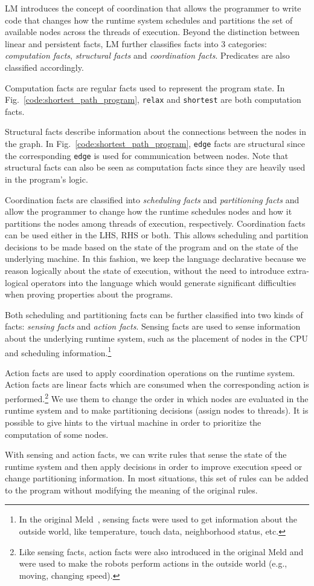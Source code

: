 LM introduces the concept of coordination that allows the programmer to write
code that changes how the runtime system schedules and partitions the set of
available nodes across the threads of execution. Beyond the distinction between
linear and persistent facts, LM further classifies facts into 3 categories:
\emph{computation facts}, \emph{structural facts} and \emph{coordination facts}.
Predicates are also classified accordingly.

Computation facts are regular facts used to represent the program state. In
Fig.~\ref{code:shortest_path_program}, \texttt{relax} and \texttt{shortest} are
both computation facts.

Structural facts describe information about the connections between the nodes in
the graph. In Fig.~\ref{code:shortest_path_program}, \texttt{edge} facts are
structural since the corresponding \texttt{edge} is used for communication
between nodes.  Note that structural facts can also be seen as computation facts
since they are heavily used in the program's logic.

Coordination facts are classified into \emph{scheduling facts} and
\emph{partitioning facts} and allow the programmer to change how the runtime
schedules nodes and how it partitions the nodes among threads of execution,
respectively. Coordination facts can be used either in the LHS, RHS or both.
This allows scheduling and partition decisions to be made based on the state of
the program and on the state of the underlying machine.  In this fashion, we
keep the language declarative because we reason logically about the state of
execution, without the need to introduce extra-logical operators into the
language which would generate significant difficulties when proving properties
about the programs.

Both scheduling and partitioning facts can be further classified into two kinds
of facts: \emph{sensing facts} and \emph{action facts}. Sensing facts are used
to sense information about the underlying runtime system, such as the placement
of nodes in the CPU and scheduling information.\footnote{In the original
   Meld~\cite{ashley-rollman-iclp09}, sensing facts were used to get information
about the outside world, like temperature, touch data, neighborhood status,
etc.}

Action facts are used to apply coordination operations on the runtime system.
Action facts are linear facts which are consumed when the corresponding action
is performed.\footnote{Like sensing facts, action facts were also introduced in the
original Meld and were used to make the robots perform actions in the outside
world (e.g., moving, changing speed).} We use them to change the order in
which nodes are evaluated in the runtime system and to make partitioning
decisions (assign nodes to threads). It is possible to give hints to the virtual
machine in order to prioritize the computation of some nodes.

With sensing and action facts, we can write rules that sense the state of the
runtime system and then apply decisions in order to improve execution speed or
change partitioning information. In most situations, this set of rules can be
added to the program without modifying the meaning of the original rules.
